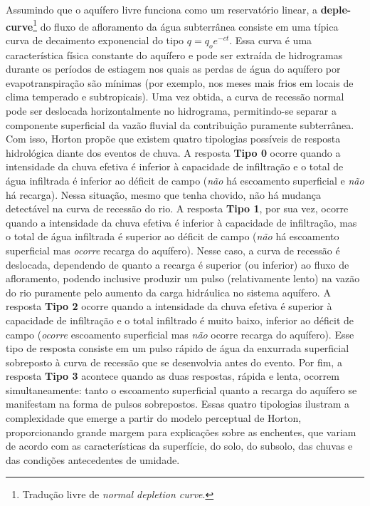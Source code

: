 \documentclass[./main.tex]{subfiles}
\begin{document}
\noindent Assumindo que o aquífero livre funciona como um reservatório linear, a \textbf{\gls{deple-curve}}\footnote{Tradução livre de \textit{normal depletion curve}.} do fluxo de afloramento da água subterrânea consiste em uma típica curva de decaimento exponencial do tipo $q = q_o e^{-c t}$. Essa curva é uma característica física constante do aquífero e pode ser extraída de hidrogramas durante os períodos de estiagem nos quais as perdas de água do aquífero por evapotranspiração são mínimas (por exemplo, nos meses mais frios em locais de clima temperado e subtropicais). Uma vez obtida, a curva de recessão normal pode ser deslocada horizontalmente no hidrograma, permitindo-se separar a componente superficial da vazão fluvial da contribuição puramente subterrânea. Com isso, Horton propõe que existem quatro  tipologias possíveis de resposta hidrológica diante dos eventos de chuva. A resposta \textbf{Tipo 0} ocorre quando a intensidade da chuva efetiva é inferior à capacidade de infiltração e o total de água infiltrada é inferior ao déficit de campo (\textit{não} há escoamento superficial e \textit{não} há recarga). Nessa situação, mesmo que tenha chovido, não há mudança detectável na curva de recessão do rio. A resposta \textbf{Tipo 1}, por sua vez, ocorre quando a intensidade da chuva efetiva é inferior à capacidade de infiltração, mas o total de água infiltrada é superior ao déficit de campo (\textit{não} há escoamento superficial mas \textit{ocorre} recarga do aquífero). Nesse caso, a curva de recessão é deslocada, dependendo de quanto a recarga é superior (ou inferior) ao fluxo de afloramento, podendo inclusive produzir um pulso (relativamente lento) na vazão do rio puramente pelo aumento da carga hidráulica no sistema aquífero. A resposta \textbf{Tipo 2} ocorre quando a intensidade da chuva efetiva é superior à capacidade de infiltração e o total infiltrado é muito baixo, inferior ao déficit de campo (\textit{ocorre} escoamento superficial mas \textit{não} ocorre recarga do aquífero). Esse tipo de resposta consiste em um pulso rápido de água da enxurrada superficial sobreposto à curva de recessão que se desenvolvia antes do evento. Por fim, a resposta \textbf{Tipo 3} acontece quando as duas respostas, rápida e lenta, ocorrem simultaneamente: tanto o escoamento superficial quanto a recarga do aquífero se manifestam na forma de pulsos sobrepostos. Essas quatro tipologias ilustram a complexidade que emerge a partir do modelo perceptual de Horton, proporcionando grande margem para explicações sobre as enchentes, que variam de acordo com as características da superfície, do solo, do subsolo, das chuvas e das condições antecedentes de umidade.
\end{document}
